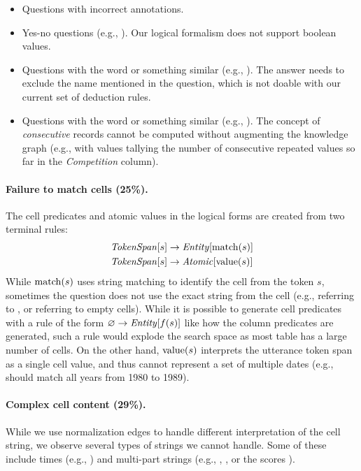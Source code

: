 \begin{itemize}
\item Questions with incorrect annotations.
\item Yes-no questions
(e.g., ).
Our logical formalism does not support boolean values.
\item Questions with the word  or something similar
(e.g., ).
The answer needs to exclude the name mentioned in the question,
which is not doable with our current set of deduction rules.
\item Questions with the word  or something similar
(e.g., ).
The concept of \emph{consecutive} records cannot be computed
without augmenting the knowledge graph
(e.g., with  values tallying the number of
consecutive repeated values so far in the \emph{Competition} column).
\end{itemize}

\paragraph{Failure to match cells (25\%).}
The cell predicates and atomic values in the logical forms
are created from two terminal rules:
\begin{align*}
\text{\emph{TokenSpan}}[s] & \to \text{\emph{Entity}}[\mathrm{match}(s)] \\
\text{\emph{TokenSpan}}[s] & \to \text{\emph{Atomic}}[\mathrm{value}(s)]
\end{align*}
While $\mathrm{match}(s)$ uses string matching
to identify the cell from the token $s$,
sometimes the question does not use the exact string from the cell
(e.g.,  referring to ,
or  referring to empty cells).
While it is possible to generate cell predicates
with a rule of the form $\varnothing \to \text{\emph{Entity}}[f(s)]$
like how the column predicates are generated,
such a rule would explode the search space
as most table has a large number of cells.
On the other hand, $\mathrm{value}(s)$ interprets
the utterance token span as a single cell value,
and thus cannot represent a set of multiple dates
(e.g.,  should match all years from 1980 to 1989).

\paragraph{Complex cell content (29\%).}
While we use normalization edges to handle different
interpretation of the cell string,
we observe several types of strings we cannot handle.
Some of these include times (e.g., )
and multi-part strings (e.g., ,
, or the scores ).

